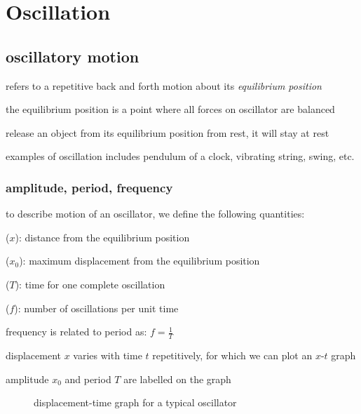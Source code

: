 \section{Oscillation} \label{section:oscillation}

\subsection{oscillatory motion}

\begin{ilight}
	 refers to a repetitive back and forth motion about its \emph{equilibrium position}
\end{ilight}

the equilibrium position is a point where all forces on oscillator are balanced

release an object from its equilibrium position from rest, it will stay at rest

examples of oscillation includes pendulum of a clock, vibrating string, swing, etc.


\subsubsection{amplitude, period, frequency}

to describe motion of an oscillator, we define the following quantities:

\cmt {} ($x$): distance from the equilibrium position

\cmt {} ($x_0$): maximum displacement from the equilibrium position

\cmt {} ($T$): time for one complete oscillation

\cmt {} ($f$): number of oscillations per unit time

frequency is related to period as: $\boxed{f=\frac{1}{T}}$

\vspace*{\baselineskip}

displacement $x$ varies with time $t$ repetitively, for which we can plot an $x$-$t$ graph

amplitude $x_0$ and period $T$ are labelled on the graph


\begin{figure}[ht]
\centering
{}

\caption*{displacement-time graph for a typical oscillator}
\end{figure}


